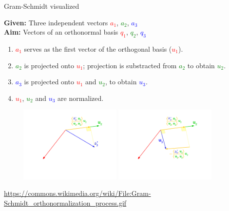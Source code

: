 \documentclass[11pt,compress,t,notes=noshow, xcolor=table]{beamer}
\begin{document}
\begin{vbframe}{Gram-Schmidt visualized}
\framebreak

\begin{scriptsize}

\textbf{Given:} Three independent vectors \textcolor{red}{$a_1$}, \textcolor{green}{$a_2$}, \textcolor{blue}{$a_3$} \\
\textbf{Aim:} Vectors of an orthonormal basis \textcolor{red}{$q_1$}, \textcolor{green}{$q_2$}, \textcolor{blue}{$q_3$}

\begin{enumerate}
  \item<2-> \textcolor{red}{$a_1$} serves as the first vector of the orthogonal basis (\textcolor{red}{$u_1$}).
  \item<3-> \textcolor{green}{$a_2$} is projected onto \textcolor{red}{$u_1$}; projection is substracted from \textcolor{green}{$a_2$}
        to obtain \textcolor{green}{$u_2$}.
  \item \textcolor{blue}{$a_3$} is projected onto \textcolor{red}{$u_1$} and \textcolor{green}{$u_2$},
        to obtain \textcolor{blue}{$u_3$}.
  \item<4-> \textcolor{red}{$u_1$}, \textcolor{green}{$u_2$} and \textcolor{blue}{$u_3$} are normalized.
\end{enumerate}

\end{scriptsize}

\begin{figure}
  \centering
  \includegraphics[width=0.45\textwidth]{figure_man/frame_098_delay-3s.png}
  \includegraphics[width=0.45\textwidth]{figure_man/frame_118_delay-4s.png}
\end{figure}
\tiny{\url{https://commons.wikimedia.org/wiki/File:Gram-Schmidt_orthonormalization_process.gif}}


\end{vbframe}
\end{document}
